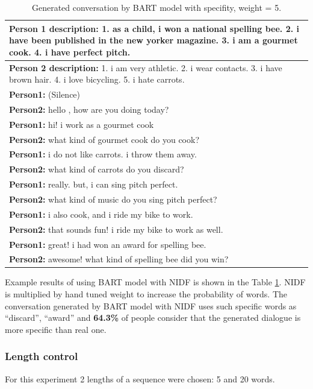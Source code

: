 \begin{table}[ht]
 \begin{tabular}{|p{14cm}|}
 \hline
 \textbf{Person 1 description:} 1. as a child, i won a national spelling bee. 2. i have been published in the new yorker magazine. 3. i am a gourmet cook. 4. i have perfect pitch. \\
 \hline
 \textbf{Person 2 description:} 1. i am very athletic. 2. i wear contacts. 3. i have brown hair. 4. i love bicycling. 5. i hate carrots. \\
 \hline
 \textbf{Person1:} (Silence) \\
 \textbf{Person2:} hello , how are you doing today? \\ 
 \textbf{Person1:} hi! i work as a gourmet cook \\
 \textbf{Person2:} what kind of gourmet cook do you cook?\\
 \textbf{Person1:} i do not like carrots. i throw them away.\\
 \textbf{Person2:} what kind of carrots do you discard? \\
 \textbf{Person1:} really. but, i can sing pitch perfect.\\
 \textbf{Person2:} what kind of music do you sing pitch perfect?\\
 \textbf{Person1:} i also cook, and i ride my bike to work.\\
 \textbf{Person2:} that sounds fun! i ride my bike to work as well. \\
 \textbf{Person1:} great! i had won an award for spelling bee. \\
 \textbf{Person2:} awesome! what kind of spelling bee did you win?\\
 \hline
 \end{tabular}
\caption{Generated conversation by BART model with specifity, weight = 5.}
\label{tab:bart_nidf}
\end{table}

Example results of using BART model with NIDF is shown in the Table \ref{tab:bart_nidf}. NIDF is multiplied by hand tuned weight to increase the probability of words. The conversation generated by BART model with NIDF uses such specific words as ``discard'', ``award'' and \textbf{64.3\%} of people consider that the generated dialogue is more specific than real one.

\subsubsection{Length control}
For this experiment 2 lengths of a sequence were chosen: 5 and 20 words.

